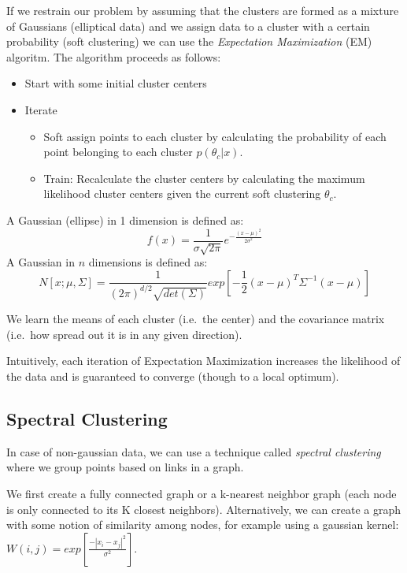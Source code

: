 \documentclass[11pt]{article}
\begin{document}
If we restrain our problem by assuming that the clusters are formed as a
mixture of Gaussians (elliptical data) and we assign data to a cluster
with a certain probability (soft clustering) we can use the
\emph{Expectation Maximization} (EM) algoritm. The algorithm proceeds as
follows:

\begin{itemize}
\tightlist
\item
  Start with some initial cluster centers
\item
  Iterate

  \begin{itemize}
  \tightlist
  \item
    Soft assign points to each cluster by calculating the probability of
    each point belonging to each cluster \(p(\theta _c | x)\).
  \item
    Train: Recalculate the cluster centers by calculating the maximum
    likelihood cluster centers given the current soft clustering
    \(\theta _c\).
  \end{itemize}
\end{itemize}

A Gaussian (ellipse) in 1 dimension is defined as:
\[f(x)=\frac{1}{\sigma \sqrt{2\pi}}e^{-\frac{(x-\mu)^2}{2\sigma ^2}}\] A
Gaussian in \(n\) dimensions is defined as:
\[N[x;\mu , \Sigma] = \frac{1}{(2\pi)^{d/2}\sqrt{det(\Sigma)}}exp[-\frac{1}{2}(x-\mu)^T\Sigma ^{-1}(x-\mu)]\]

We learn the means of each cluster (i.e.~the center) and the covariance
matrix (i.e.~how spread out it is in any given direction).

Intuitively, each iteration of Expectation Maximization increases the
likelihood of the data and is guaranteed to converge (though to a local
optimum).

\subsection{Spectral Clustering}\label{spectral-clustering}

In case of non-gaussian data, we can use a technique called
\emph{spectral clustering} where we group points based on links in a
graph.

We first create a fully connected graph or a k-nearest neighbor graph
(each node is only connected to its K closest neighbors). Alternatively,
we can create a graph with some notion of similarity among nodes, for
example using a gaussian kernel:
\(W(i, j)=exp[\frac{-|x_i-x_j|^2}{\sigma ^2}]\).
\end{document}
